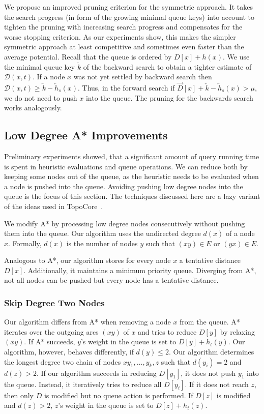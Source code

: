 \documentclass[a4paper,UKenglish,cleveref, autoref, thm-restate]{lipics-v2021}
\newcommand*{\dist}{\mathcal{D}}
\begin{document}
We propose an improved pruning criterion for the symmetric approach.
It takes the search progress (in form of the growing minimal queue keys) into account to tighten the pruning with increasing search progress and compensates for the worse stopping criterion.
As our experiments show, this makes the simpler symmetric approach at least competitive and sometimes even faster than the average potential.
Recall that the queue is ordered by $D[x] + h(x)$.
We use the minimal queue key $\overleftarrow{k}$ of the backward search to obtain a tighter estimate of $\dist(x,t)$.
If a node $x$ was not yet settled by backward search then $\dist(x,t) \geq \overleftarrow{k} - \overleftarrow{h}_s(x)$.
Thus, in the forward search if $\overrightarrow{D}[x] + \overleftarrow{k} - \overleftarrow{h}_s(x) > \mu$, we do not need to push $x$ into the queue.
The pruning for the backwards search works analogously.

\subsection{Low Degree A* Improvements}\label{sec:low-deg-improvment}

Preliminary experiments showed, that a significant amount of query running time is spent in heuristic evaluations and queue operations.
We can reduce both by keeping some nodes out of the queue, as the heuristic needs to be evaluated when a node is pushed into the queue.
Avoiding pushing low degree nodes into the queue is the focus of this section.
The techniques discussed here are a lazy variant of the ideas used in TopoCore~\cite{DBLP:conf/gis/DibbeltSW15}.

We modify A* by processing low degree nodes consecutively without pushing them into the queue.
Our algorithm uses the undirected degree $d(x)$ of a node $x$.
Formally, $d(x)$ is the number of nodes $y$ such that $(xy)\in E$ or $(yx)\in E$.

Analogous to A*, our algorithm stores for every node $x$ a tentative distance $D[x]$.
Additionally, it maintains a minimum priority queue.
Diverging from A*, not all nodes can be pushed but every node has a tentative distance.

\subsubsection{Skip Degree Two Nodes}

Our algorithm differs from A* when removing a node $x$ from the queue.
A* iterates over the outgoing arcs $(xy)$ of $x$ and tries to reduce $D[y]$ by relaxing $(xy)$.
If A* succeeds, $y$'s weight in the queue is set to $D[y]+h_t(y)$.
Our algorithm, however, behaves differently, if $d(y)\le 2$.
Our algorithm determines the longest degree two chain of nodes $x y_1,\ldots, y_k, z$ such that $d(y_i)=2$ and $d(z) > 2$.
If our algorithm succeeds in reducing $D[y_1]$, it does not push $y_1$ into the queue.
Instead, it iteratively tries to reduce all $D[y_i]$.
If it does not reach $z$, then only $D$ is modified but no queue action is performed.
If $D[z]$ is modified and $d(z)>2$, $z$'s weight in the queue is set to $D[z]+h_t(z)$.
\end{document}
